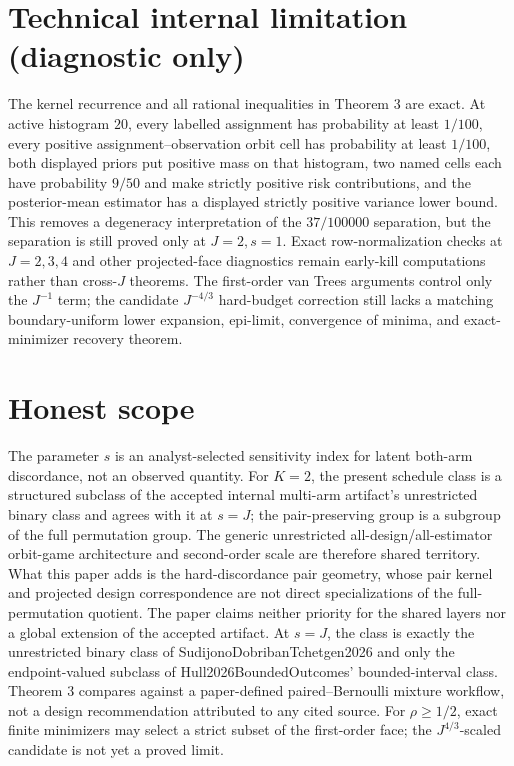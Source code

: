 \documentclass{article}
\begin{document}
\section*{Technical internal limitation (diagnostic only)}

The kernel recurrence and all rational inequalities in Theorem 3 are exact. At active histogram \(20\), every labelled assignment has probability at least \(1/100\), every positive assignment--observation orbit cell has probability at least \(1/100\), both displayed priors put positive mass on that histogram, two named cells each have probability \(9/50\) and make strictly positive risk contributions, and the posterior-mean estimator has a displayed strictly positive variance lower bound. This removes a degeneracy interpretation of the \(37/100000\) separation, but the separation is still proved only at \(J=2,s=1\). Exact row-normalization checks at \(J=2,3,4\) and other projected-face diagnostics remain early-kill computations rather than cross-\(J\) theorems. The first-order van Trees arguments control only the \(J^{-1}\) term; the candidate \(J^{-4/3}\) hard-budget correction still lacks a matching boundary-uniform lower expansion, epi-limit, convergence of minima, and exact-minimizer recovery theorem.

\section{Honest scope}

The parameter \(s\) is an analyst-selected sensitivity index for latent both-arm discordance, not an observed quantity. For \(K=2\), the present schedule class is a structured subclass of the accepted internal multi-arm artifact's unrestricted binary class and agrees with it at \(s=J\); the pair-preserving group is a subgroup of the full permutation group. The generic unrestricted all-design/all-estimator orbit-game architecture and second-order scale are therefore shared territory. What this paper adds is the hard-discordance pair geometry, whose pair kernel and projected design correspondence are not direct specializations of the full-permutation quotient. The paper claims neither priority for the shared layers nor a global extension of the accepted artifact. At \(s=J\), the class is exactly the unrestricted binary class of SudijonoDobribanTchetgen2026 and only the endpoint-valued subclass of Hull2026BoundedOutcomes' bounded-interval class. Theorem 3 compares against a paper-defined paired--Bernoulli mixture workflow, not a design recommendation attributed to any cited source. For \(\rho\ge1/2\), exact finite minimizers may select a strict subset of the first-order face; the \(J^{4/3}\)-scaled candidate is not yet a proved limit.
\end{document}
